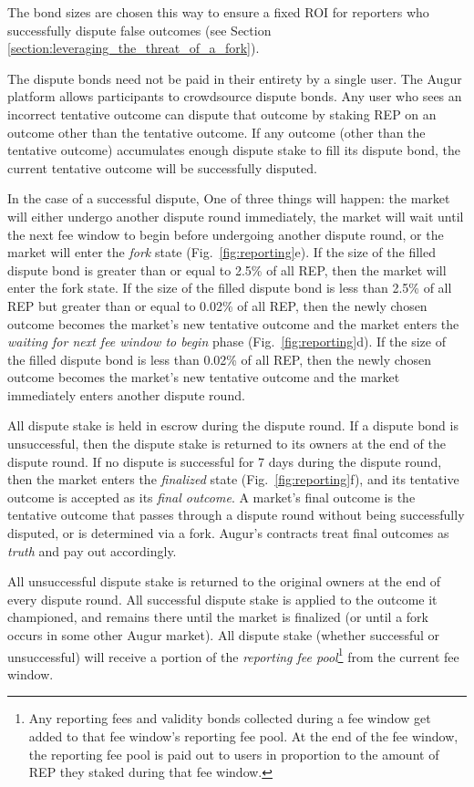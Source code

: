 \documentclass[floatfix,reprint,nofootinbib,amsmath,amssymb,epsfig,pre,floats,letterpaper,groupedaffiliation]{revtex4-1}
\theoremstyle{definition}
\theoremstyle{definition}
\begin{document}
The bond sizes are chosen this way to ensure a fixed ROI for reporters who successfully dispute false outcomes (see Section \ref{section:leveraging_the_threat_of_a_fork}).

The dispute bonds need not be paid in their entirety by a single user.  The Augur platform allows participants to crowdsource dispute bonds.  Any user who sees an incorrect tentative outcome can dispute that outcome by staking REP on an outcome other than the tentative outcome. If any outcome (other than the tentative outcome) accumulates enough dispute stake to fill its dispute bond, the current tentative outcome will be successfully disputed.

In the case of a successful dispute, One of three things will happen: the market will either undergo another dispute round immediately, the market will wait until the next fee window to begin before undergoing another dispute round, or the market will enter the \textit{fork} state (Fig.~\ref{fig:reporting}e).  If the size of the filled dispute bond is greater than or equal to 2.5\% of all REP, then the market will enter the fork state. If the size of the filled dispute bond is less than 2.5\% of all REP but greater than or equal to 0.02\% of all REP, then the newly chosen outcome becomes the market's new tentative outcome and the market enters the \textit{waiting for next fee window to begin} phase (Fig.~\ref{fig:reporting}d). If the size of the filled dispute bond is less than 0.02\% of all REP, then the newly chosen outcome becomes the market's new tentative outcome and the market immediately enters another dispute round.

All dispute stake is held in escrow during the dispute round. If a dispute bond is unsuccessful, then the dispute stake is returned to its owners at the end of the dispute round. If no dispute is successful for 7 days during the dispute round, then the market enters the \textit{finalized} state (Fig.~\ref{fig:reporting}f), and its tentative outcome is accepted as its \textit{final outcome}.  A market's final outcome is the tentative outcome that passes through a dispute round without being successfully disputed, or is determined via a fork.  Augur's contracts treat final outcomes as \textit{truth} and pay out accordingly.

All unsuccessful dispute stake is returned to the original owners at the end of every dispute round.  All successful dispute stake is applied to the outcome it championed, and remains there until the market is finalized (or until a fork occurs in some other Augur market).  All dispute stake (whether successful or unsuccessful) will receive a portion of the \textit{reporting fee pool}\footnote{Any reporting fees and validity bonds collected during a fee window get added to that fee window's reporting fee pool.  At the end of the fee window, the reporting fee pool is paid out to users in proportion to the amount of REP they staked during that fee window.} from the current fee window.
\end{document}
